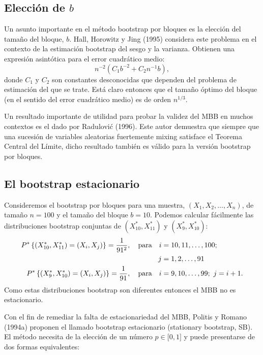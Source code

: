 \documentclass[
]{book}
\theoremstyle{break}
\theoremstyle{nonumberplain}
\begin{document}
\subsection{\texorpdfstring{Elección de \(b\)}{Elección de b}}\label{elecciuxf3n-de-b}

Un asunto importante en el método bootstrap por bloques es la elección
del tamaño del bloque, \(b\). Hall, Horowitz y Jing (1995) considera este
problema en el contexto de la estimación bootstrap del sesgo y la
varianza. Obtienen una expresión asintótica para el error cuadrático
medio:
\[n^{-2}(C_1b^{-2}+C_2n^{-1}b),\]
donde \(C_1\) y \(C_2\) son
constantes desconocidas que dependen del problema de estimación del que
se trate. Está claro entonces que el tamaño óptimo del bloque (en el
sentido del error cuadrático medio) es de orden \(n^{1/3}\).

Un resultado importante de utilidad para probar la validez del MBB en
muchos contextos es el dado por Radulović (1996). Este autor demuestra
que siempre que una sucesión de variables aleatorias fuertemente mixing
satisface el Teorema Central del Límite, dicho resultado también es
válido para la versión bootstrap por bloques.

\subsection{El bootstrap estacionario}\label{el-bootstrap-estacionario}

Consideremos el bootstrap por bloques para una muestra,
\((X_1,X_2,\ldots
,X_n)\), de tamaño \(n=100\) y el tamaño del bloque \(b=10\). Podemos
calcular fácilmente las distribuciones bootstrap conjuntas de
\((X_{10}^{\ast},X_{11}^{\ast})\) y \((X_{9}^{\ast},X_{10}^{\ast})\):
\[\begin{aligned}
P^{\ast}\left\{ (X_{10}^{\ast},X_{11}^{\ast})=(X_i,X_j)\right\} =
\frac{1}{91^2},\quad \hbox{para}\quad i &= 10,11,\ldots ,100; \\
j &= 1,2,\ldots ,91 \\
P^{\ast}\left\{ (X_{9}^{\ast},X_{10}^{\ast})=(X_i,X_j)\right\} =\frac{
1}{91},\quad \hbox{para}\quad i &= 9,10,\ldots ,99;\,\,j=i+1.\end{aligned}\]Como
estas distribuciones bootstrap son diferentes entonces el MBB no es
estacionario.

Con el fin de remediar la falta de estacionariedad del MBB, Politis y
Romano (1994a) proponen el llamado bootstrap estacionario (stationary
bootstrap, SB). El método necesita de la elección de un número \(p\in
\lbrack 0,1]\) y puede presentarse de dos formas equivalentes:
\end{document}

